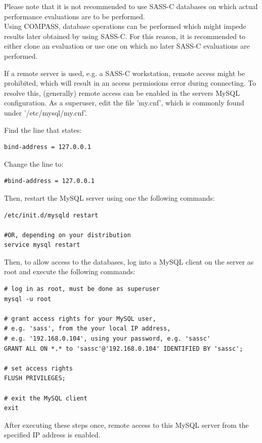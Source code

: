 Please note that it is not recommended to use SASS-C databases on which actual performance evaluations are to be performed. \\
Using COMPASS, database operations can be performed which might impede results later obtained by using SASS-C. For this reason, it is recommended to either clone an evaluation or use one on which no later SASS-C evaluations are performed.

If a remote server is used, e.g. a SASS-C workstation, remote access might be prohibited, which will result in an access permissions error during connecting. To resolve this, (generally) remote access can be enabled in the servers MySQL configuration. As a superuser, edit the file 'my.cnf', which is commonly found under '/etc/mysql/my.cnf'. 

Find the line that states:
\begin{lstlisting}
bind-address = 127.0.0.1
\end{lstlisting}

Change the line to:

\begin{lstlisting}
#bind-address = 127.0.0.1
\end{lstlisting}

Then, restart the MySQL server using one the following commands:

\begin{lstlisting}
/etc/init.d/mysqld restart

#OR, depending on your distribution
service mysql restart
\end{lstlisting}

Then, to allow access to the databases, log into a MySQL client on the server as root and execute the following commands:

\begin{lstlisting}
# log in as root, must be done as superuser
mysql -u root

# grant access rights for your MySQL user, 
# e.g. 'sass', from the your local IP address, 
# e.g. '192.168.0.104', using your password, e.g. 'sassc'
GRANT ALL ON *.* to 'sassc'@'192.168.0.104' IDENTIFIED BY 'sassc';

# set access rights
FLUSH PRIVILEGES;

# exit the MySQL client
exit
\end{lstlisting}

After executing these steps once, remote access to this MySQL server from the specified IP address is enabled.


